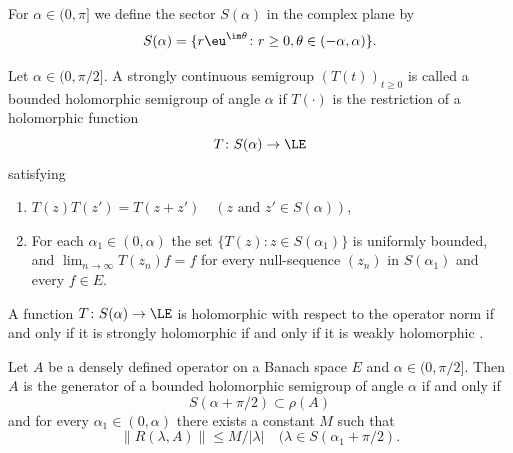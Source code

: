 For $\alpha \in (0,\pi]$ we define the sector $S(\alpha)$ in the complex plane by
\[
    S(\alpha) = \{r\eu^{\im\theta} \colon r \geq 0, \theta \in (-\alpha,\alpha)\} .
\]
\begin{definition}\label{def:a2-1.11}
Let $\alpha \in (0,\pi/2]$.
A strongly continuous semigroup $(T(t))_{t \geq 0}$ is called a bounded holomorphic semigroup of angle $\alpha$ if\/ $T(\cdot)$ is the restriction of a holomorphic function
\[
    T \colon S(\alpha) \to \LE
\]
satisfying
\begin{enumerate}[\upshape(i), wide, labelindent=.25em]

\item
$T(z)T(z') = T(z+z') \quad (z \text{ and } z' \in S(\alpha))$,

\item
For each  $ \alpha_{1} \in (0,\alpha) $  the set   
$ \{ T(z) \colon z \in S(\alpha_{1}) \} $
is uniformly bounded, and  
$\lim_{n \to \infty} T(z_{n})f = f$ 
for every null-sequence  $(z_{n})$ 
in  $ S( \alpha_{1} ) $  and every   $f \in E$.

\end{enumerate}
\end{definition}
\begin{remark*}\label{rem:a2-1.5-kgk}
A function $T \colon S(\alpha) \to \LE$ is holomorphic with respect to the operator norm if and only if it is strongly holomorphic if and only if it is weakly holomorphic \textcite[V.3]{yosida:1965}.
\end{remark*}
\begin{theorem}\label{thm:a2-1.12}
Let $A$ be a densely defined operator on a Banach space $E$ and $\alpha \in (0,\pi/2]$.
Then $A$ is the generator of a bounded holomorphic semigroup of angle $\alpha$ if and only if 
\[
S(\alpha + \pi/2) \subset \rho(A)
\]
and for every $\alpha_{1} \in (0,\alpha)$ there exists a constant $M$ such that
\begin{equation}\label{eq:a2-1.6}
    \|R(\lambda,A)\| \leq M/|\lambda| \quad (\lambda \in S(\alpha_{1} + \pi/2). 
\end{equation}
\end{theorem}
